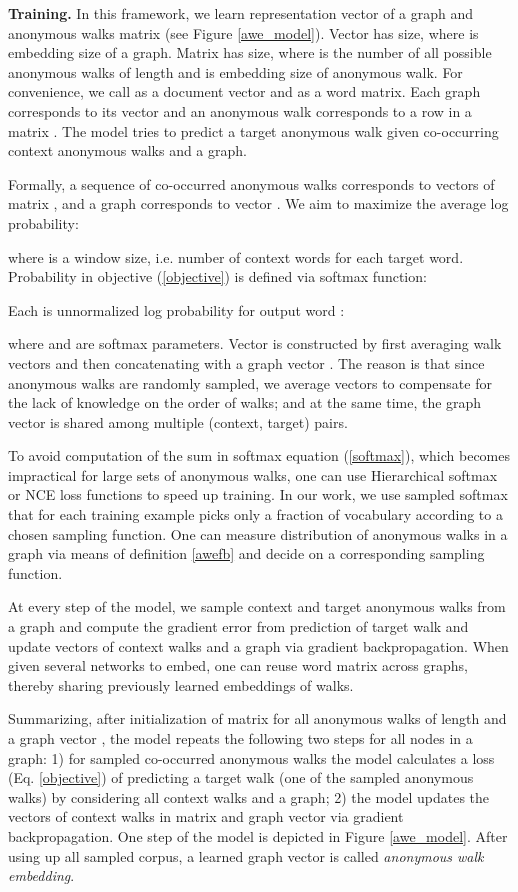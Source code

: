 \documentclass{article}
\theoremstyle{definition}
\begin{document}
\textbf{Training.} In this framework, we learn representation vector  of a graph and anonymous walks matrix  (see Figure \ref{awe_model}). Vector  has  size, where  is embedding size of a graph. Matrix  has  size, where  is the number of all possible anonymous walks of length  and  is embedding size of anonymous walk. For convenience, we call  as a document vector and  as a word matrix. Each graph corresponds to its vector  and an anonymous walk corresponds to a row in a matrix . The model tries to predict a target anonymous walk given co-occurring context anonymous walks and a graph. 

Formally, a sequence of co-occurred anonymous walks  corresponds to vectors  of matrix , and a graph  corresponds to vector . We aim to maximize the average log probability:



where  is a window size, i.e. number of context words for each target word. Probability in objective (\ref{objective}) is defined via softmax function:


Each  is unnormalized log probability for output word : 

where  and  are softmax parameters. Vector  is constructed by first averaging walk vectors  and then concatenating with a graph vector . The reason is that since anonymous walks are randomly sampled, we average vectors  to compensate for the lack of knowledge on the order of walks; and at the same time, the graph vector  is shared among multiple (context, target) pairs. 

To avoid computation of the sum in softmax equation (\ref{softmax}), which becomes impractical for large sets of anonymous walks, one can use Hierarchical softmax \cite{negativesampling} or NCE loss functions \cite{nce} to speed up training. In our work, we use sampled softmax \cite{sampledsoftmax} that for each training example picks only a fraction of vocabulary according to a chosen sampling function. One can measure distribution of anonymous walks in a graph via means of definition \ref{awefb} and decide on a corresponding sampling function.

At every step of the model, we sample context and target anonymous walks from a graph and compute the gradient error from prediction of target walk and update vectors of context walks and a graph via gradient backpropagation. When given several networks to embed, one can reuse word matrix  across graphs, thereby sharing previously learned embeddings of walks.

Summarizing, after initialization of matrix  for all anonymous walks of length  and a graph vector ,  the model repeats the following two steps for all nodes in a graph: 1) for sampled co-occurred anonymous walks the model calculates a loss (Eq. \ref{objective}) of predicting a target walk (one of the sampled anonymous walks) by considering all context walks and a graph; 2) the model updates the vectors of context walks in matrix  and graph vector  via gradient backpropagation. One step of the model is depicted in Figure \ref{awe_model}. After using up all sampled corpus, a learned graph vector  is called \textit{anonymous walk embedding}.
\end{document}

